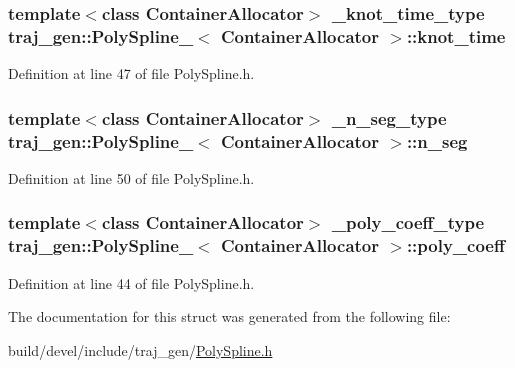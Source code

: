 \subsubsection[{\texorpdfstring{knot\+\_\+time}{knot_time}}]{\setlength{\rightskip}{0pt plus 5cm}template$<$class Container\+Allocator$>$ {\bf \+\_\+knot\+\_\+time\+\_\+type} {\bf traj\+\_\+gen\+::\+Poly\+Spline\+\_\+}$<$ Container\+Allocator $>$\+::knot\+\_\+time}\hypertarget{structtraj__gen_1_1_poly_spline___a244b6ee80a42fc29772de46dab1f259f}{}\label{structtraj__gen_1_1_poly_spline___a244b6ee80a42fc29772de46dab1f259f}


Definition at line 47 of file Poly\+Spline.\+h.

\subsubsection[{\texorpdfstring{n\+\_\+seg}{n_seg}}]{\setlength{\rightskip}{0pt plus 5cm}template$<$class Container\+Allocator$>$ {\bf \+\_\+n\+\_\+seg\+\_\+type} {\bf traj\+\_\+gen\+::\+Poly\+Spline\+\_\+}$<$ Container\+Allocator $>$\+::n\+\_\+seg}\hypertarget{structtraj__gen_1_1_poly_spline___aa7abf080efc8e19690ac95f3222b1f23}{}\label{structtraj__gen_1_1_poly_spline___aa7abf080efc8e19690ac95f3222b1f23}


Definition at line 50 of file Poly\+Spline.\+h.

\subsubsection[{\texorpdfstring{poly\+\_\+coeff}{poly_coeff}}]{\setlength{\rightskip}{0pt plus 5cm}template$<$class Container\+Allocator$>$ {\bf \+\_\+poly\+\_\+coeff\+\_\+type} {\bf traj\+\_\+gen\+::\+Poly\+Spline\+\_\+}$<$ Container\+Allocator $>$\+::poly\+\_\+coeff}\hypertarget{structtraj__gen_1_1_poly_spline___a0f2e8bfe261fae6f2b762c093c0d692d}{}\label{structtraj__gen_1_1_poly_spline___a0f2e8bfe261fae6f2b762c093c0d692d}


Definition at line 44 of file Poly\+Spline.\+h.



The documentation for this struct was generated from the following file\+:\begin{DoxyCompactItemize}
\item 
build/devel/include/traj\+\_\+gen/\hyperlink{_poly_spline_8h}{Poly\+Spline.\+h}\end{DoxyCompactItemize}
